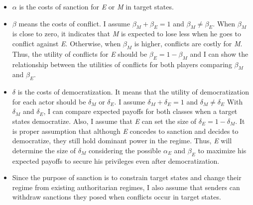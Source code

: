 \documentclass[11pt]{article}
\begin{document}
\begin{itemize}
	\item $\alpha$ is the costs of sanction for \textit{E} or \textit{M} in target states. 
	\item $\beta$ means the costs of conflict. I assume $ \beta_{M} + \beta_{E} = 1$ and $\beta_{M} \neq \beta_{E}$. When $\beta_{M}$ is close to zero, it indicates that \textit{M} is expected to lose less when he goes to conflict against \textit{E}. Otherwise, when $\beta_{M}$ is higher, conflicts are costly for \textit{M}. Thus, the utility of conflicts for \textit{E} should be $\beta_{E} = 1-\beta_{M}$ and I can show the relationship between the utilities of conflicts for both players comparing $\beta_{M}$ and $\beta_{E}$.
	\item $\delta$ is the costs of democratization. It means that the utility of democratization for each actor should be $\delta_{M}$ or $\delta_{E}$. I assume $\delta_{M} + \delta_{E} = 1$ and $\delta_{M} \neq \delta_{E}$ With $\delta_{M}$ and $\delta_{E}$, I can compare expected payoffs for both classes when a target states democratize. Also, I assume that \textit{E} can set the size of $\delta_{E} = 1-\delta_{M}$. It is proper assumption that although \textit{E} concedes to sanction and decides to democratize, they still hold dominant power in the regime. Thus, \textit{E} will determine the size of $\delta_{M}$ considering the possible $\alpha_{E}$ and $\beta_{E}$ to maximize his expected payoffs to secure his privileges even after democratization.
	\item Since the purpose of sanction is to constrain target states and change their regime from existing authoritarian regimes, I also assume that senders can withdraw sanctions they posed when conflicts occur in target states.
\end{itemize}
	
\begin{center}
	
\end{center}
\end{document}

